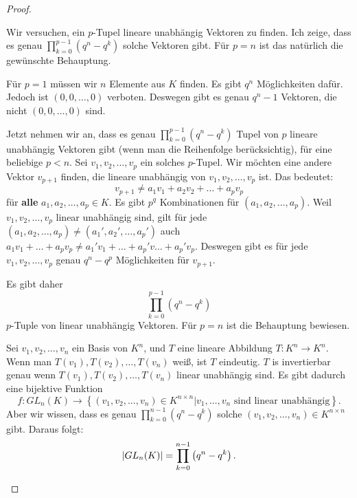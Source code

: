 \begin{proof}
	\begin{parts}	
	\item Wir versuchen, ein $p$-Tupel lineare unabhängig Vektoren zu finden. Ich zeige, dass es genau $\prod_{k=0}^{p-1}\left( q^n-q^k \right)$ solche Vektoren gibt. F\"{u}r $p=n$ ist das nat\"{u}rlich die gew\"{u}nschte Behauptung.

	F\"{u}r $p=1$ müssen wir $n$ Elemente aus $K$ finden. Es gibt $q^n$ Möglichkeiten dafür. Jedoch ist $(0,0,\dots,0)$ verboten. Deswegen gibt es genau $q^n-1$ Vektoren, die nicht $(0,0,\dots,0)$ sind.

	Jetzt nehmen wir an, dass es genau $\prod_{k=0}^{p-1} \left( q^n-q^k \right)  $ Tupel von $p$ lineare unabhängig Vektoren gibt (wenn man die Reihenfolge berücksichtig), f\"{u}r eine beliebige $p<n$. Sei $v_1,v_2,\dots, v_p$ ein solches $p$-Tupel. Wir möchten eine andere Vektor  $v_{p+1}$ finden, die lineare unabhängig von $v_1,v_2,\dots, v_p$ ist. Das bedeutet:
	\[
		v_{p+1}\neq a_1v_1+a_2v_2+\dots+a_p v_p
	\] 
	f\"{u}r \textbf{alle} $a_1,a_2,\dots, a_p\in K$. Es gibt $p^q$ Kombinationen f\"{u}r $(a_1,a_2,\dots,a_p)$. Weil $v_1,v_2,\dots, v_p$ linear unabhängig sind, gilt f\"{u}r jede $(a_1,a_2,\dots, a_p)\neq (a_1',a_2',\dots, a_p')$ auch $a_1v_1+\dots+a_pv_p\neq a_1'v_1+\dots+a_p' v\dots+a_p' v_p$. Deswegen gibt es f\"{u}r jede $v_1,v_2,\dots, v_p$ genau $q^n-q^p$ Möglichkeiten für $v_{p+1}$. 

Es gibt daher
\[
\prod_{k=0}^{p-1}\left( q^n-q^k \right)   
\]
$p$-Tuple von linear unabhängig Vektoren. F\"{u}r $p=n$ ist die Behauptung bewiesen.
\item Sei $v_1,v_2,\dots, v_n$ ein Basis von $K^n$, und $T$ eine lineare Abbildung $T:K^n\to K^n$. Wenn man $T(v_1),T(v_2),\dots, T(v_n)$ weiß, ist $T$ eindeutig. $T$ is invertierbar genau wenn $T(v_1), T(v_2),\dots,T(v_n)$ linear unabhängig sind. Es gibt dadurch eine bijektive Funktion
	\[
		f:GL_n(K)\to \left\{ (v_1,v_2,\dots,v_n)\in K^{n \times n}|v_1,\dots, v_n\text{ sind linear unabhängig} \right\} 
	.\] 
	Aber wir wissen, dass es genau $\prod_{k=0}^{n-1} \left( q^n-q^k \right)  $ solche $(v_1,v_2,\dots,v_n)\in K^{n \times n}$ gibt. Daraus folgt:
	\[
	\left|GL_n(K)\right|=\prod_{k=0}^{n-1} \left( q^n-q^k \right)  
	.\qedhere\] 
	\end{parts}
\end{proof}
